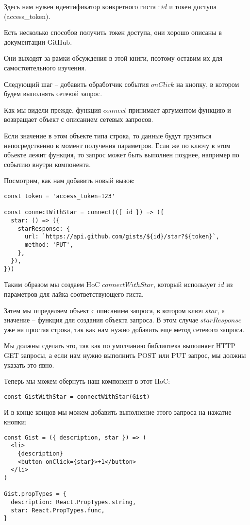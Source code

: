 Здесь нам нужен идентификатор конкретного гиста $:id$ и токен доступа (access\_token).

Есть несколько способов получить токен доступа, они хорошо описаны в документации GitHub.

Они выходят за рамки обсуждения в этой книги, поэтому оставим их для самостоятельного изучения.

Следующий шаг -- добавить обработчик события $onClick$ на кнопку, в котором будем выполнять сетевой запрос.

Как мы видели прежде, функция $connect$ принимает аргументом функцию и возвращает объект с описанием сетевых запросов.

Если значение в этом объекте типа строка, то данные будут грузиться непосредственно в момент получения параметров. Если же по ключу в этом объекте лежит функция, то запрос может быть выполнен позднее, например по событию внутри компонента.

Посмотрим, как нам добавить новый вызов:

\begin{lstlisting}
const token = 'access_token=123'

const connectWithStar = connect(({ id }) => ({
  star: () => ({
    starResponse: {
      url: `https://api.github.com/gists/${id}/star?${token}`,
      method: 'PUT',
    }, 
  }),
}))
\end{lstlisting}

Таким образом мы создаем HoC $connectWithStar$, который использует $id$ из параметров для лайка соответствующего гиста.

Затем мы определяем объект с описанием запроса, в котором ключ $star$, а значение -- функция для создания объекта запроса. В этом случае $starResponse$ уже на простая строка, так как нам нужно добавить еще метод сетевого запроса.

Мы должны сделать это, так как по умолчанию библиотека выполняет HTTP GET запросы, а если нам нужно выполнить POST или PUT запрос, мы должны указать это явно.

Теперь мы можем обернуть наш компонент в этот HoC:

\begin{lstlisting}
const GistWithStar = connectWithStar(Gist)
\end{lstlisting}

И в конце концов мы можем добавить выполнение этого запроса на нажатие кнопки:

\begin{lstlisting}
const Gist = ({ description, star }) => (
  <li>
    {description}
    <button onClick={star}>+1</button>
  </li>
)

Gist.propTypes = {
  description: React.PropTypes.string,
  star: React.PropTypes.func,
}
\end{lstlisting}

